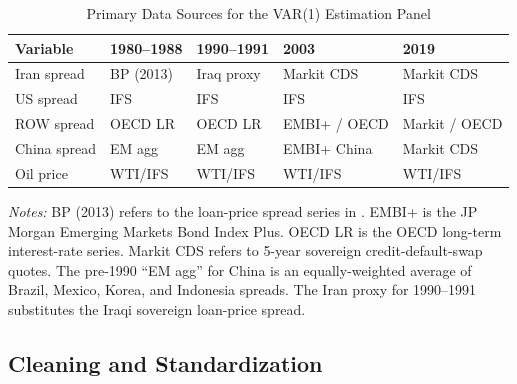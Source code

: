 \documentclass[12pt]{article}
\begin{document}
\begin{table}[htbp]
\centering
\caption{Primary Data Sources for the VAR(1) Estimation Panel}
\label{tab:data_sources}
\begin{threeparttable}
\begin{tabular}{lllll}
\toprule
Variable & 1980--1988 & 1990--1991 & 2003 & 2019 \\
\midrule
Iran spread & BP (2013) & Iraq proxy & Markit CDS & Markit CDS \\
US spread & IFS & IFS & IFS & IFS \\
ROW spread & OECD LR & OECD LR & EMBI+ / OECD & Markit / OECD \\
China spread & EM agg & EM agg & EMBI+ China & Markit CDS \\
Oil price & WTI/IFS & WTI/IFS & WTI/IFS & WTI/IFS \\
\bottomrule
\end{tabular}
\begin{tablenotes}
\small
\item \textit{Notes:} BP (2013) refers to the loan-price spread series in \citet{borensztein2013debt}. EMBI+ is the JP Morgan Emerging Markets Bond Index Plus. OECD LR is the OECD long-term interest-rate series. Markit CDS refers to 5-year sovereign credit-default-swap quotes. The pre-1990 ``EM agg'' for China is an equally-weighted average of Brazil, Mexico, Korea, and Indonesia spreads. The Iran proxy for 1990--1991 substitutes the Iraqi sovereign loan-price spread.
\end{tablenotes}
\end{threeparttable}
\end{table}

\subsection{Cleaning and Standardization}
\end{document}
